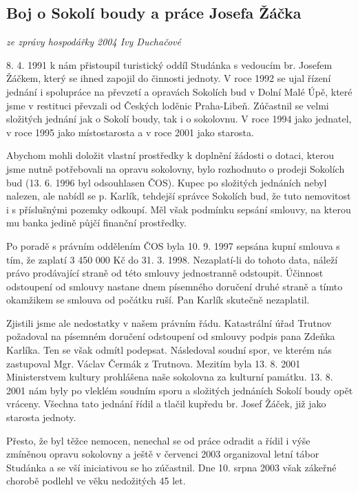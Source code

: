 \subsection{Boj o Sokolí boudy a práce Josefa
Žáčka}\label{boj-o-sokoluxed-boudy-a-pruxe1ce-josefa-ux17euxe1ux10dka}

\emph{ze zprávy hospodářky 2004 Ivy Duchačové}

8. 4. 1991 k nám přistoupil turistický oddíl Studánka s vedoucím br.
Josefem Žáčkem, který se ihned zapojil do činnosti jednoty. V roce 1992
se ujal řízení jednání i spolupráce na převzetí a opravách Sokolích bud
v Dolní Malé Úpě, které jsme v restituci převzali od Českých loděnic
Praha-Libeň. Zúčastnil se velmi složitých jednání jak o Sokolí boudy,
tak i o sokolovnu. V roce 1994 jako jednatel, v roce 1995 jako
místostarosta a v roce 2001 jako starosta.

Abychom mohli doložit vlastní prostředky k doplnění žádosti o dotaci,
kterou jsme nutně potřebovali na opravu sokolovny, bylo rozhodnuto o
prodeji Sokolích bud (13. 6. 1996 byl odsouhlasen ČOS). Kupec po
složitých jednáních nebyl nalezen, ale nabídl se p. Karlík, tehdejší
správce Sokolích bud, že tuto nemovitost i s příslušnými pozemky
odkoupí. Měl však podmínku sepsání smlouvy, na kterou mu banka jedině
půjčí finanční prostředky.

Po poradě s právním oddělením ČOS byla 10. 9. 1997 sepsána kupní smlouva
s tím, že zaplatí 3 450 000 Kč do 31. 3. 1998. Nezaplatí-li do tohoto
data, náleží právo prodávající straně od této smlouvy jednostranně
odstoupit. Účinnost odstoupení od smlouvy nastane dnem písemného
doručení druhé straně a tímto okamžikem se smlouva od počátku ruší. Pan
Karlík skutečně nezaplatil.

Zjistili jsme ale nedostatky v našem právním řádu. Katastrální úřad
Trutnov požadoval na písemném doručení odstoupení od smlouvy podpis pana
Zdeňka Karlíka. Ten se však odmítl podepsat. Následoval soudní spor, ve
kterém nás zastupoval Mgr. Václav Čermák z Trutnova. Mezitím byla 13. 8.
2001 Ministerstvem kultury prohlášena naše sokolovna za kulturní
památku. 13. 8. 2001 nám byly po vleklém soudním sporu a složitých
jednáních Sokolí boudy opět vráceny. Všechna tato jednání řídil a tlačil
kupředu br. Josef Žáček, již jako starosta jednoty.

Přesto, že byl těžce nemocen, nenechal se od práce odradit a řídil i
výše zmíněnou opravu sokolovny a ještě v červenci 2003 organizoval letní
tábor Studánka a se vší iniciativou se ho zúčastnil. Dne 10. srpna 2003
však zákeřné chorobě podlehl ve věku nedožitých 45 let.

